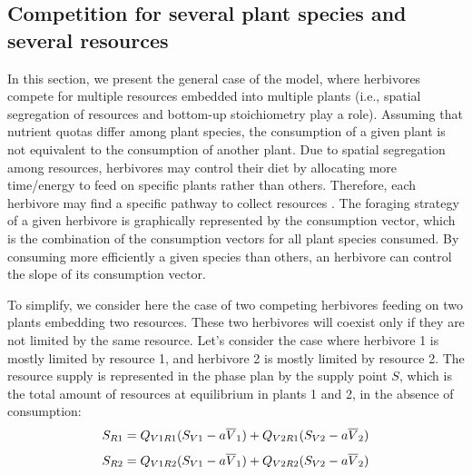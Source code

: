 \documentclass[12pt]{article}
\newcommand\barre[1]{\overline{\rule{0pt}{1.5ex}#1}}
\begin{document}



\subsection*{Competition for several plant species and several resources}

In this section, we present the general case of the model, where herbivores compete for multiple resources embedded into multiple plants (i.e., spatial segregation of resources and bottom-up stoichiometry play a role). Assuming that nutrient quotas differ among plant species, the consumption of a given plant is not equivalent to the consumption of another plant. Due to spatial segregation among resources, herbivores may control their diet by allocating more time/energy to feed on specific plants rather than others. Therefore, each herbivore may find a specific pathway to collect resources \citep{Simpson1995, Raubenheimer1999}. The foraging strategy of a given herbivore is graphically represented by the consumption vector, which is the combination of the consumption vectors for all plant species consumed. %
By consuming more efficiently a given species than others, an herbivore can control the slope of its consumption vector. 
\par
To simplify, we consider here the case of two competing herbivores feeding on two plants embedding two resources. %
These two herbivores will coexist only if they are not limited by the same resource. Let's consider the case where herbivore 1 is mostly limited by resource 1, and herbivore 2 is mostly limited by resource 2. The resource supply is represented in the phase plan by the supply point $S$, which is the total amount of resources at equilibrium in plants 1 and 2, in the absence of consumption:
\begin{equation}
S_{R1}=Q_{V1R1}(S_{V1}-a\barre{V}_1)+Q_{V2R1}(S_{V2}-a\barre{V}_2)
\end{equation}
\begin{equation}
S_{R2}=Q_{V1R2}(S_{V1}-a\barre{V}_1)+Q_{V2R2}(S_{V2}-a\barre{V}_2)
\end{equation}
\end{document}
